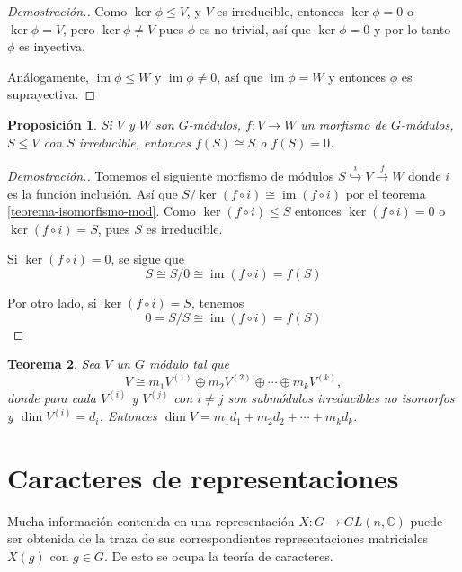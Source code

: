 \documentclass[12pt]{book}
\newtheorem{theorem}{Teorema}[section]
\newtheorem{proposition}[theorem]{Proposición}
\theoremstyle{definition}
\DeclareMathOperator{\im}{im}
\newcounter{in}
\begin{document}
\begin{proof}[Demostración.]
  Como $\ker \phi\leq V$, y $V$ es irreducible, entonces $\ker \phi=0$
  o $\ker\phi=V$, pero  $\ker\phi\neq V$ pues $\phi$ es no trivial,
  así que $\ker \phi=0$ y por lo tanto $\phi$ es inyectiva. 

  Análogamente, $\im\phi\leq W$ y $\im \phi\neq 0$, así que $\im
  \phi=W$ y entonces $\phi$ es suprayectiva.
\end{proof}

\begin{proposition}
  \label{im-mod-irreducible}
   Si $V$ y $W$ son $G$-módulos, $f:V\rightarrow W$ un morfismo de $G$-módulos, $S\leq V$ con $S$
  irreducible, entonces $f(S)\cong S$ o $f(S)=0$.
\end{proposition}

\begin{proof}[Demostración.]
  Tomemos el siguiente morfismo de módulos
  $S\stackrel{i}{\hookrightarrow} V\stackrel{f}{\rightarrow}W$ donde
  $i$ es la función inclusión. Así que $S/\ker(f\circ i)\cong\im(f\circ
  i)$ por el teorema \ref{teorema-isomorfismo-mod}. Como $\ker(f\circ
  i)\leq S$ entonces $\ker(f\circ i)=0$ o $\ker(f\circ i)=S$, pues $S$ es irreducible.

  Si $\ker(f\circ i)=0$, se sigue que
  $$S\cong S/0\cong\im(f\circ i)=f(S)$$

  Por otro lado, si $\ker(f\circ i)=S$, tenemos
  $$0=S/S\cong\im(f\circ i)=f(S)$$
\end{proof}

\begin{theorem}
  Sea $V$ un $G$ módulo tal que
  \begin{equation*}
    V\cong m_{1}V^{(1)}\oplus m_{2}V^{(2)}\oplus\cdots\oplus
    m_{k}V^{(k)},
  \end{equation*}
  donde para cada $V^{(i)}$ y $V^{(j)}$ con $i\neq j$ son submódulos irreducibles no isomorfos y $\dim
  V^{(i)}=d_{i}$. Entonces $\dim V=m_{1}d_{1}+m_{2}d_{2}+\cdots+m_{k}d_{k}.$
\end{theorem}

\section{Caracteres de representaciones}
\label{caracteres}

Mucha información contenida en una representación $X:G\rightarrow
GL(n,\mathbb{C})$ puede ser obtenida de la traza de sus
correspondientes representaciones matriciales $X(g)$ con $g\in G$. De
esto se ocupa la teoría de caracteres.
\end{document}
